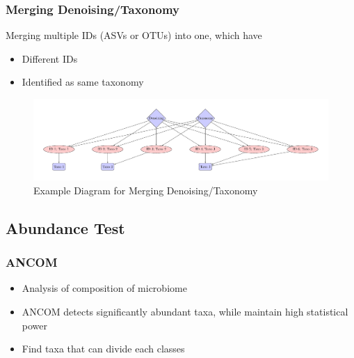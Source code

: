 \documentclass{beamer}
\begin{document}
    \begin{frame}
        \frametitle{Merging Denoising/Taxonomy}

        Merging multiple IDs (ASVs or OTUs) into one, which have
        \begin{itemize}
            \item Different IDs
            \item Identified as same taxonomy
        \end{itemize}

        \begin{figure}
            \includegraphics[width=0.8 \linewidth]{figures/tikz/merging.pdf}
            \caption{Example Diagram for Merging Denoising/Taxonomy}
        \end{figure}
    \end{frame}

    \subsection{Abundance Test}
    \begin{frame}
        \frametitle{ANCOM}

        \begin{itemize}
            \item Analysis of composition of microbiome \cite{ANCOM1}
            \item ANCOM detects significantly abundant taxa, while maintain high statistical power
            \item Find taxa that can divide each classes
        \end{itemize}
    \end{frame}
\end{document}
